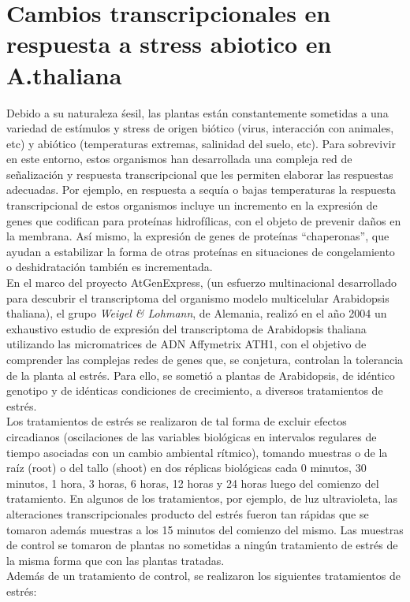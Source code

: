 \section{Cambios transcripcionales en respuesta a stress abiotico en A.thaliana}\label{sec:wiegel}
Debido a su naturaleza śesil, las plantas están constantemente sometidas a una variedad de estímulos y stress de origen biótico (virus, interacción con animales, etc) y abiótico (temperaturas extremas, salinidad del suelo, etc). Para sobrevivir en este entorno, estos organismos han desarrollada una compleja red de señalización y respuesta transcripcional que les permiten elaborar las respuestas adecuadas. Por ejemplo, en respuesta a sequía o bajas temperaturas la respuesta transcripcional de estos organismos incluye un incremento en la expresión de genes que codifican para proteínas hidrofílicas, con el objeto de prevenir daños en la membrana. Así mismo, la expresión de genes de proteínas ``chaperonas'', que ayudan a estabilizar la forma de otras proteínas
en situaciones de congelamiento o deshidratación también es incrementada.\\
En el marco del proyecto AtGenExpress, (un esfuerzo multinacional desarrollado para descubrir el transcriptoma del organismo modelo multicelular Arabidopsis thaliana), el grupo \textit{Weigel \& Lohmann}, de Alemania, realizó en el año 2004 un exhaustivo estudio de expresión del transcriptoma de Arabidopsis thaliana utilizando las micromatrices de ADN Affymetrix ATH1, con el objetivo de comprender las complejas redes de genes que, se conjetura, controlan la tolerancia de la planta al estrés. Para ello, se sometió a plantas de Arabidopsis, de idéntico genotipo y de idénticas condiciones de crecimiento, a diversos tratamientos de estrés.\\
Los tratamientos de estrés se realizaron de tal forma de excluir efectos circadianos (oscilaciones de las variables biológicas en intervalos regulares de tiempo asociadas con un cambio ambiental rítmico), tomando muestras o de la raíz (root) o del tallo (shoot) en dos réplicas biológicas cada 0 minutos, 30 minutos, 1 hora, 3 horas, 6 horas, 12 horas y 24 horas luego del comienzo del tratamiento. En algunos de los tratamientos, por ejemplo, de luz ultravioleta, las alteraciones transcripcionales producto del estrés fueron tan rápidas que se tomaron además muestras a los 15 minutos del comienzo  del mismo. Las muestras de control se tomaron de plantas no sometidas a ningún tratamiento de estrés de la misma forma que con las plantas tratadas.\\
Además de un tratamiento de control, se realizaron los siguientes tratamientos de estrés:
